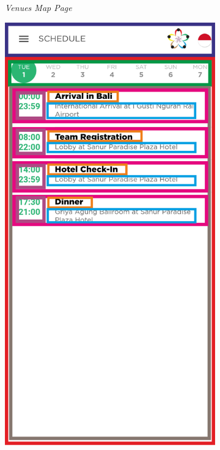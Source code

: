 \begin{enumerate}
\begin{figure}[H]
\begin{subfigure}[b]{0.247\textwidth}
	    \caption{\textit{Venues Map Page}}
	    \label{fig:VenueMapPageWireframe}
     \end{subfigure}
	\begin{subfigure}[b]{0.247\textwidth}
    \centering
	    \includegraphics[scale=0.4]{Gambar/SchedulePageWireframe.png}

\end{subfigure}
\end{figure}
\end{enumerate}
